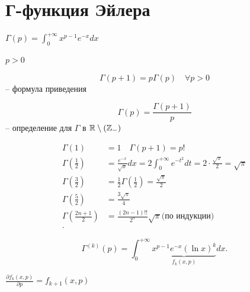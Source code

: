 \section{Г-функция Эйлера}

\begin{definition}
    $\Gamma(p) = \int_0^{+\infty }x^{p-1}e^{-x}dx$

    $p >0$
\end{definition}

\begin{property}
    \[\Gamma(p+1) = p\Gamma(p)\quad \forall p >0\] -- формула приведения

    \[\Gamma(p) = \frac{\Gamma(p+1)}{p}\] -- определение для $\Gamma$ в $\mathbb{R}\setminus \left( \mathbb{Z}_- \right) $

    \begin{align*}
    \Gamma(1) &= 1\quad \Gamma(p + 1) = p!\\
    \Gamma(\frac{1}{2}) &= \frac{e^{-x}}{\sqrt{x}}dx = 2\int_0^{+\infty }e^{-t^2}dt = 2 \cdot \frac{\sqrt{\pi}}{2} = \sqrt{\pi}\\
    \Gamma(\frac{3}{2}) &= \frac{1}{2} \Gamma(\frac{1}{2}) = \frac{\sqrt{\pi} }{2}\\
    \Gamma(\frac{5}{2}) &= \frac{3\sqrt{\pi} }{4}\\
    \Gamma(\frac{2n+1}{2}) &= \frac{(2n-1)!!}{2^n} \sqrt{\pi} \text{(по индукции)}\\
    .\end{align*}
\end{property}

\begin{note}
    \[
    \Gamma^{(k)}(p) = \int_0^{+\infty } \underbrace{x^{p-1}e^{-x} \left( \ln x \right) ^k}_{f_k(x, p)} dx
    .\] 

    $\frac{\partial f_k(x, p)}{\partial p} = f_{k+1}(x, p)$
\end{note}

